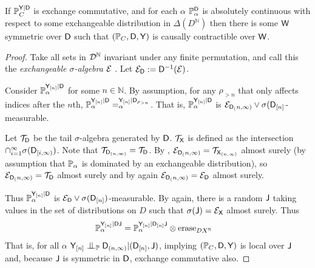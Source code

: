 \begin{theorem}\label{lem:exch_prod_ciid}
If $\mathbb{P}_C^{\mathsf{Y}|\mathsf{D}}$ is exchange commutative, and for each $\alpha$ $\mathbb{P}_\alpha^{\mathsf{D}}$ is absolutely continuous with respect to some exchangeable distribution in $\Delta(D^{\mathbb{N}})$ then there is some $\mathsf{W}$ symmetric over $\mathsf{D}$ such that $(\mathbb{P}_C,\mathsf{D},\mathsf{Y})$ is causally contractible over $\mathsf{W}$.
\end{theorem}

\begin{proof}
Take all sets in $\mathcal{D}^{\mathbb{N}}$ invariant under any finite permutation, and call this the \emph{exchangeable $\sigma$-algebra} $\mathcal{E}$ \citep[pg. 29]{kallenberg_basic_2005}. Let $\mathcal{E}_{\mathsf{D}}:=\mathsf{D}^{-1}(\mathcal{E})$.

Consider $\mathbb{P}_\alpha^{\mathsf{Y}_{[n]}|\mathsf{D}}$ for some $n\in \mathbb{N}$. By assumption, for any $\rho_{>n}$ that only affects indices after the $n$th, $\mathbb{P}_\alpha^{\mathsf{Y}_{[n]}|\mathsf{D}}=_\alpha^{\mathsf{Y}_{[n]}|\mathsf{D}_{\rho_{>n}}}$. That is, $\mathbb{P}_\alpha^{\mathsf{Y}_{[n]}|\mathsf{D}}$ is $\mathcal{E}_{\mathsf{D}_(n,\infty)}\vee\sigma(\mathsf{D}_{[n]}$-measurable.

Let $\mathcal{T}_{\mathsf{D}}$ be the tail $\sigma$-algebra generated by $\mathsf{D}$. $\mathcal{T}_{\mathsf{X}}$ is defined as the intersection $\cap_{i=1}^{\infty} \sigma(\mathsf{D}_{[i,\infty)})$. Note that $\mathcal{T}_{\mathsf{D}_{(n,\infty)}}=\mathcal{T}_{\mathsf{D}}$. By \citet[Corollary 1.6]{kallenberg_basic_2005}, $\mathcal{E}_{\mathsf{D}_(n,\infty)}=\mathcal{T}_{\mathsf{X}_{(n,\infty)}}$ almost surely (by assumption that $\mathbb{P}_\alpha$ is dominated by an exchangeable distribution), so $\mathcal{E}_{\mathsf{D}_(n,\infty)}=\mathcal{T}_{\mathsf{D}}$ almost surely and by \citet[Corollary 1.6]{kallenberg_basic_2005} again $\mathcal{E}_{\mathsf{D}_(n,\infty)}=\mathcal{E}_{\mathsf{D}}$ almost surely.

Thus $\mathbb{P}_\alpha^{\mathsf{Y}_{[n]}|\mathsf{D}}$ is $\mathcal{E}_{\mathsf{D}}\vee\sigma(\mathsf{D}_{[n]})$-measurable. By \citet[Corollary 1.6]{kallenberg_basic_2005} again, there is a random $\mathsf{J}$ taking values in the set of distributions on $D$ such that $\sigma(\mathsf{J})=\mathcal{E}_{\mathsf{X}}$ almost surely. Thus
\begin{align}
    \mathbb{P}_\alpha^{\mathsf{Y}_{[n]}|\mathsf{D}\mathsf{J}} &= \mathbb{P}_\alpha^{\mathsf{Y}_{[n]}|\mathsf{D}_{[n]}\mathsf{J}}\otimes \text{erase}_{DX^{\mathbb{N}}}
\end{align}
That is, for all $\alpha$ $\RV{Y}_{[n]}\CI_{\prob{P}} \RV{D}_{(n,\infty)}|(\RV{D}_{[n]},\RV{J})$, implying $(\mathbb{P}_C,\mathsf{D},\mathsf{Y})$ is local over $\mathsf{J}$ and, because $\mathsf{J}$ is symmetric in $\mathsf{D}$, exchange commutative also.

\end{proof}

